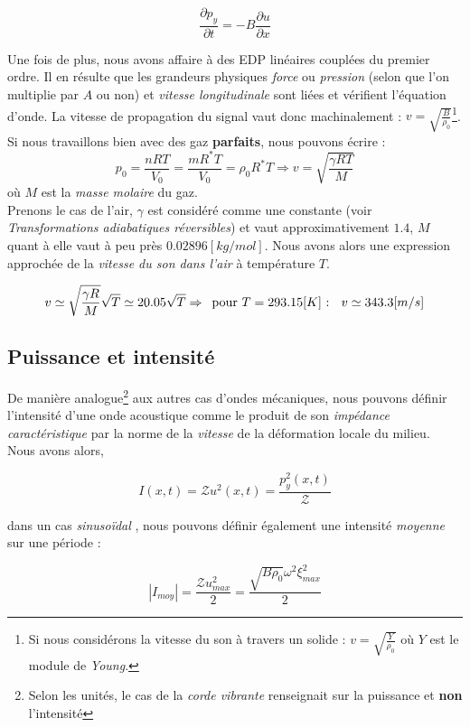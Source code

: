 \[\frac{\partial p_{y}}{\partial t} =  - B \frac{\partial u}{\partial x}\]


Une fois de plus, nous avons affaire à des EDP linéaires couplées du premier ordre. Il en résulte que les grandeurs physiques \textit{force} ou \textit{pression} (selon que l'on multiplie par $A$ ou non) et 
\textit{vitesse longitudinale} sont liées et vérifient l'équation d'onde. La vitesse de propagation du signal vaut donc machinalement : $v = \sqrt{\frac{B}{\rho_{0}}}$\footnote{Si nous considérons la vitesse du son à travers un solide : $v = \sqrt{\frac{Y}{\rho_{0}}}$ où $Y$ est le module de \textit{Young}.}.  Si nous travaillons bien avec des
gaz \textbf{parfaits}, nous pouvons écrire : $$p_{0} = \frac{nRT}{V_{0}}= \frac{mR^{*}T}{V_{0}} = \rho_{0}R^{*}T \Rightarrow v = \sqrt{\frac{\gamma RT}{M}}$$ où $M$ est la \textit{masse molaire} du gaz. \\
Prenons le cas de l'air, $\gamma$ est considéré comme une constante (voir \textit{Transformations adiabatiques réversibles}) et vaut approximativement $1.4$, $M$ quant à elle
vaut à peu près $0.02896 [kg/mol]$. Nous avons alors une expression approchée de la \textit{vitesse du son dans l'air} à température $T$. 

\[ v \simeq \sqrt{\frac{\gamma R}{M}} \sqrt{T} \simeq 20.05 \sqrt{T} \Rightarrow \hspace{5 pt} \mbox{pour $T = 293.15[K]$ : } \hspace{5pt} v \simeq 343.3 [m/s]\]

\subsection{Puissance et intensité}

De manière analogue\footnote{Selon les unités, le cas de la \textit{corde vibrante} renseignait sur la puissance et \textbf{non} l'intensité} aux autres cas d'ondes mécaniques, nous pouvons définir l'intensité d'une onde acoustique comme le produit de son \textit{impédance caractéristique}
par la norme de la \textit{vitesse} de la déformation locale du milieu. \\ 
Nous avons alors, 

\[I(x,t) = \mathcal{Z} u^{2}(x,t) = \frac{p_{y}^{2}(x,t)}{\mathcal{Z}}\]

dans un cas \textit{sinusoïdal}%
, nous pouvons définir également une intensité \textit{moyenne} sur une période : 

\[ |I_{moy}| = \frac{\mathcal{Z} u^{2}_{max}}{2} = \frac{\sqrt{B \rho_{0}} \omega^{2} \xi_{max}^{2}}{2}\]

